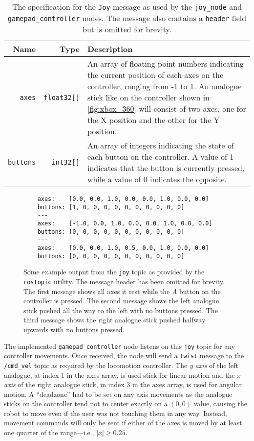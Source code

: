 \begin{table}[!h]
	\centering
	\begin{tabular}{ r r p{10cm} }
		\toprule
		\textbf{Name} & \textbf{Type} & \textbf{Description} \\
		\midrule

		\texttt{axes} & 
		\texttt{float32[]} &
		An array of floating point numbers indicating the current position of each axes on the controller, ranging from -1 to 1. An analogue stick like on the controller shown in \autoref{fig:xbox_360} will consist of two axes, one for the X position and the other for the Y position. \\
		\hline
		\texttt{buttons} & 
		\texttt{int32[]} & 
		An array of integers indicating the state of each button on the controller. A value of 1 indicates that the button is currently pressed, while a value of 0 indicates the opposite. \\
		\bottomrule
	\end{tabular}
	\caption{The specification for the \texttt{Joy} message as used by the \texttt{joy\_node} and \texttt{gamepad\_controller} nodes. The message also contains a \texttt{header} field but is omitted for brevity.}
	\label{tab:joy_msg}
\end{table}

\begin{figure}[!h]
	\centering
	\begin{lstlisting}
	axes:    [0.0, 0.0, 1.0, 0.0, 0.0, 1.0, 0.0, 0.0]
	buttons: [1, 0, 0, 0, 0, 0, 0, 0, 0, 0, 0]
	---
	axes:    [-1.0, 0.0, 1.0, 0.0, 0.0, 1.0, 0.0, 0.0]
	buttons: [0, 0, 0, 0, 0, 0, 0, 0, 0, 0, 0]
	---
	axes:    [0.0, 0.0, 1.0, 0.5, 0.0, 1.0, 0.0, 0.0]
	buttons: [0, 0, 0, 0, 0, 0, 0, 0, 0, 0, 0]
	\end{lstlisting}
	\caption{Some example output from the \texttt{joy} topic as provided by the \texttt{rostopic} utility. The message header has been omitted for brevity. The first message shows all axes it rest while the \emph{A} button on the controller is pressed. The second message shows the left analogue stick pushed all the way to the left with no buttons pressed. The third message shows the right analogue stick pushed halfway upwards with no buttons pressed.}
	\label{fig:joy_example}
\end{figure}

The implemented \texttt{gamepad\_controller} node listens on this \texttt{joy} topic for any controller movements. Once received, the node will send a \texttt{Twist} message to the \texttt{/cmd\_vel} topic as required by the locomotion controller. The \emph{y axis} of the left analogue, at index 1 in the axes array, is used stick for linear motion and the \emph{x axis} of the right analogue stick, in index 3 in the axes array, is used for angular motion. A ``deadzone'' had to be set on any axis movements as the analogue sticks on the controller tend not to center exactly on a $(0, 0)$ value, causing the robot to move even if the user was not touching them in any way. Instead, movement commands will only be sent if either of the axes is moved by at least one quarter of the range---i.e., $|x| \geq 0.25$.

